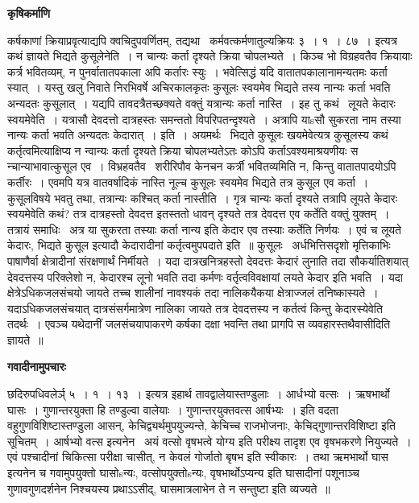 \documentclass[11pt, openany]{book}
\begin{document}
\begin{center}
\textbf{\Large कृषिकर्माणि \textendash\ }
\end{center}

कर्षकाणां क्रियाप्रवृत्याद्यपि क्वचिदुपवर्णितम्, तद्यथा \textendash\ कर्मवत्कर्मणातुल्यक्रियः ३~। १~। ८७~। इत्यत्र कथं ज्ञायते भिद्यते कुसूलेनेति~। न चान्यः कर्ता दृश्यते क्रिया चोपलभ्यते~। किञ्च भो विग्रहवतैव क्रियायाः कर्त्र भवितव्यम्, न पुनर्वातातपकाला अपि कर्तारः स्युः~। भवेत्सिद्धं यदि वातातपकालानामन्यतमः कर्ता स्यात्~। यस्तु खलु निवाते निरभिवर्षे अचिरकालकृतः कुसूलः स्वयमेव भिद्यते तस्य नान्यः कर्ता भवति अन्यदतः कुसूलात्~। यद्यपि तावदत्रैतच्छक्यते वक्तुं यत्रान्यः कर्ता नास्ति~। इह तु कथं \textendash\ लूयते केदारः स्वयमेवेति~। यत्रासौ देवदत्तो दात्रहस्तः समन्ततो विपरिपतन्दृश्यते~। अत्रापि याsसौ सुकरता नाम तस्या नान्यः कर्ता भवति अन्यदतः केदारात्~। इति~। अयमर्थः \textendash\ भिद्यते कुसूलः खयमेवेत्यत्र कुसूलस्य कथं कर्तृत्वमित्याक्षिप्य न न्वान्यः कर्ता दृश्यते क्रिया चोपलभ्यतेऽतः कोऽपि कर्ताऽवश्यमाश्रयणीयः स न्चान्याभावात्कुसूल एव~। विभ्रहवतैव \textendash\ शरीरिपौव केनचन कर्त्री भवितव्यमिति न, किन्तु वातातपादयोऽपि कर्तीरः~। एवमपि यत्र वातवर्षादिकं नास्ति नूल्च कुसूलः स्वयमेव भिद्यते तत्र कुसूल एव कर्ता~। कुसूलविषये भवतु तथा, तत्रान्यः कश्चित् कर्ता नास्तीति~। गृत्र चान्यः कर्ता दृश्यते तत्रापि लूयते केदारः स्वयमेवेति कथं? तत्र दात्रहस्तो देवदत्त इतस्ततो धावन् दृश्यते तत्र देवदत्त एव कर्तेति वक्तुं युक्तम्~। तत्रायं समाधिः \textendash\ अत्र या सुकरता तस्याः कर्ता नान्य इति केदार एव तस्याः कर्तेति निर्णयः~। एवं च लूयते केदारः, भिद्यते कुसूल इत्यादौ केदारादीनां कर्तृत्वमुपपदाते इति~॥ कुसूलः \textendash\ अर्धभित्तिसदृशो मृत्तिकाभिः पाषाणैर्वा क्षेत्रादीनां संरक्षणार्थं निर्मीयते~। यदा दात्रखनित्रहस्तो देवदत्तः केदारं लुनाति तदा सौकर्यातिशयात् देवदत्तस्य परिक्लेशो न, केदारश्च लूनो भवति तदा कर्मणः वर्तृत्वविवक्षायां लयते केदार इति भवति~। यदा क्षेत्रेऽधिकजलसंचयो जायते तच्च शालीनां नावश्यकं तदा नालिकयैकया क्षेत्राज्जलं तनिष्कास्यते~। यदाऽधिकजलसंचयात् दात्रसंसर्गमात्रेण नालिका जायते तत्र देवदत्तस्य न कर्तत्वं किन्तु केदारस्येवेति तदर्थः~। एवञ्च यथेदानीं जलसंचयापाकरणे कर्षका दक्षा भवन्ति तथा प्रागपि स व्यवहारस्तथैवासीदिति ज्ञायते~॥

\begin{center}
\textbf{\Large गवादीनामुपचारः \textendash\ }
\end{center}

छदिरुपधिवलेर्ञ् ५~। १~। १३~। इत्यत्र {\qt इहार्थ तावद्वालेयास्तण्डुलाः}~। आर्धभ्यो वत्सः~। ऋषभार्थो घासः~। गुणान्तरयुक्ता हि तण्डुल्वा वालेयाः~। गुणान्तरयुक्तवत्स आर्षभ्यः~। इति वदता वहुगुणविशिष्टास्तण्डुला आसन्, केचिद्व्यर्थमुपयुज्यन्ते, केचिच्च राजभोजनाः, केचिद्गुणान्तरविशिष्टा इति सूचितम्~। आर्षभ्यो वत्स इत्यनेन \textendash\ अयं वत्सो वृषभत्वे योग्य इति परीक्ष्य तादृश एव वृषभकरणे नियुज्यते~। एवं पश्चादीनां चिकित्सा परीक्षा चासीत्, न केवलं गोर्जातो बृषभ इति स्वीकारः~। तथा ऋमभार्थो घास इत्यनेन च गवामुपयुक्तो घासोsन्यः, वत्सोपयुक्तोsन्यः, वृषभार्थोऽप्यन्य इति घासादीनां पशूनाञ्च गुणावगुणदर्शनेन निश्चयस्य प्रथाऽऽसीद्, घासमात्रलाभेन ते न सन्तुष्टा इति व्यज्यते~॥\\
\end{document}
